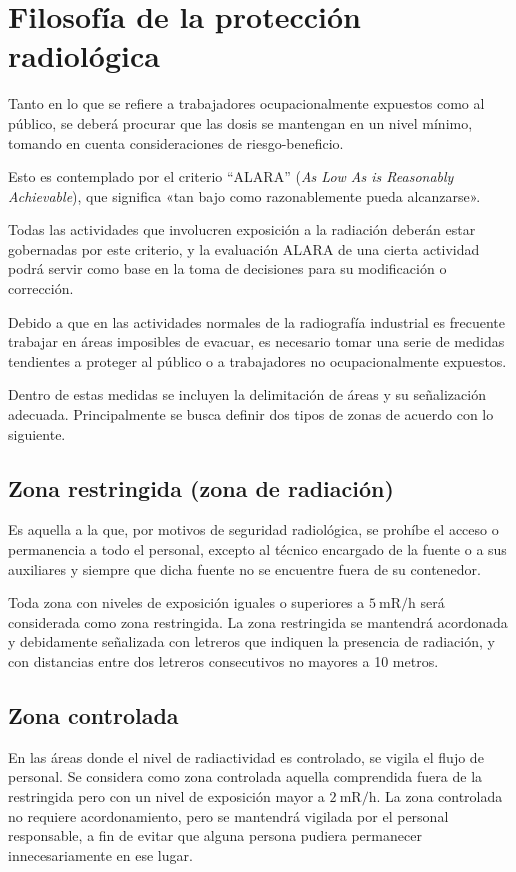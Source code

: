 \chapter{Filosofía de la protección radiológica}

Tanto en lo que se refiere a trabajadores ocupacionalmente expuestos como al público, se deberá procurar que las dosis se mantengan en un nivel mínimo, tomando en cuenta consideraciones de riesgo-beneficio.

Esto es contemplado por el criterio ``ALARA'' (\emph{As Low As is Reasonably Achievable}), que significa «tan bajo como razonablemente pueda alcanzarse».

Todas las actividades que involucren exposición a la radiación deberán estar gobernadas por este criterio, y la evaluación ALARA de una cierta actividad podrá servir como base en la toma de decisiones para su modificación o corrección.

Debido a que en las actividades normales de la radiografía industrial es frecuente trabajar en áreas imposibles de evacuar, es necesario tomar una serie de medidas tendientes a proteger al público o a trabajadores no ocupacionalmente expuestos.

Dentro de estas medidas se incluyen la delimitación de áreas y su señalización adecuada. Principalmente se busca definir dos tipos de zonas de acuerdo con lo siguiente.

\section{Zona restringida (zona de radiación)}

Es aquella a la que, por motivos de seguridad radiológica, se prohíbe el acceso o permanencia a todo el personal, excepto al técnico encargado de la fuente o a sus auxiliares y siempre que dicha fuente no se encuentre fuera de su contenedor.

Toda zona con niveles de exposición iguales o superiores a $5\ \mathrm{mR/h}$ será considerada como zona restringida. La zona restringida se mantendrá acordonada y debidamente señalizada con letreros que indiquen la presencia de radiación, y con distancias entre dos letreros consecutivos no mayores a 10 metros.

\section{Zona controlada}

En las áreas donde el nivel de radiactividad es controlado, se vigila el flujo de personal. Se considera como zona controlada aquella comprendida fuera de la restringida pero con un nivel de exposición mayor a $2\ \mathrm{mR/h}$. La zona controlada no requiere acordonamiento, pero se mantendrá vigilada por el personal responsable, a fin de evitar que alguna persona pudiera permanecer innecesariamente en ese lugar.

